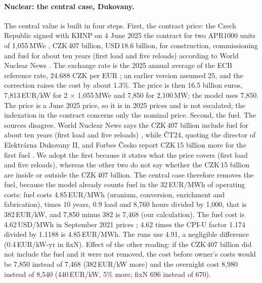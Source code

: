 \paragraph{Nuclear: the central case, Dukovany.} The central value is built in four steps. First, the contract price: the Czech Republic signed with KHNP on 4 June 2025 the contract for two APR1000 units of 1{,}055\,MWe \citep{Dukovany2024,WNNDukovanySigned2025,EnerdataDukovany2025}, CZK\,407 billion, USD\,18.6 billion, for construction, commissioning and fuel for about ten years (first load and five reloads) according to World Nuclear News \citep{WNNKHNPplans}. The exchange rate is the 2025 annual average of the ECB reference rate, 24.688 CZK per EUR \citep{EurostatFX}; an earlier version assumed 25, and the correction raises the cost by about 1.3\%. The price is then 16.5 billion euros, 7{,}813\,EUR/kW for 2 $\times$ 1{,}055\,MWe and 7{,}850 for 2{,}100\,MW; the model uses 7{,}850. The price is a June 2025 price, so it is in 2025 prices and is not escalated; the indexation in the contract concerns only the nominal price. Second, the fuel. The sources disagree. World Nuclear News says the CZK\,407 billion include fuel for about ten years (first load and five reloads) \citep{WNNKHNPplans}, while \v{C}T24, quoting the director of Elektr\'arna Dukovany II, and Forbes \v{C}esko report CZK\,15 billion more for the first fuel \citep{CT24Dukovany,ForbesDukovany}. We adopt the first because it states what the price covers (first load and five reloads), whereas the other two do not say whether the CZK\,15 billion are inside or outside the CZK\,407 billion. The central case therefore removes the fuel, because the model already counts fuel in the 32\,EUR/MWh of operating costs: fuel costs 4.85\,EUR/MWh (uranium, conversion, enrichment and fabrication), times 10 years, 0.9 load and 8{,}760 hours divided by 1{,}000, that is 382\,EUR/kW, and 7{,}850 minus 382 is 7{,}468 (our calculation). The fuel cost is 4.62\,USD/MWh in September 2021 prices \citep{WNAecon}; 4.62 times the CPI-U factor 1.174 divided by 1.1188 is 4.85\,EUR/MWh. The runs use 4.91, a negligible difference (0.4\,EUR/kW-yr in fixN). Effect of the other reading: if the CZK\,407 billion did not include the fuel and it were not removed, the cost before owner's costs would be 7{,}850 instead of 7{,}468 (382\,EUR/kW more) and the overnight cost 8{,}980 instead of 8{,}540 (440\,EUR/kW, 5\% more; fixN 696 instead of 670).


